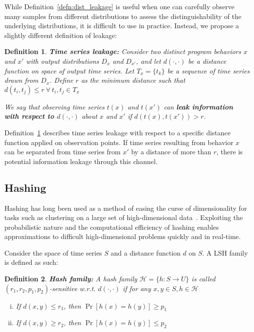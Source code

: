 \documentclass[a4paper]{article}
\newtheorem{definition}{Definition}
\begin{document}
While Definition~\ref{defn:dist_leakage} is useful when one can carefully observe many samples from different distributions to assess the distinguishability of the underlying distributions, it is difficult to use in practice.
Instead, we propose a slightly different definition of leakage:

\begin{definition}\label{defn:leakage}
	\textbf{Time series leakage:} Consider two distinct program behaviors $x$ and $x'$ with output distributions $D_x$ and $D_{x'}$, and let $d(\cdot,\cdot)$ be a distance function on space of output time series.
    Let $T_x = \{t_k\}$ be a sequence of time series drawn from $D_x$.
    Define $r$ as the minimum distance such that $d(t_i, t_j) \le r~\forall~t_i,t_j \in T_x$

    We say that observing time series $t(x)$ and $t(x')$ can \textbf{leak information with respect to $d(\cdot,\cdot)$} about $x$ and $x'$ if $d(t(x),t(x')) > r$.
\end{definition}

Definition~\ref{defn:leakage} describes time series leakage with respect to a specific distance function applied on observation points.
If time series resulting from behavior $x$ can be separated from time series from $x'$ by a distance of more than $r$, there is potential information leakage through this channel.

\subsection{Hashing}
\label{subsec:hashing}
Hashing has long been used as a method of easing the curse of dimensionality for tasks such as clustering on a large set of high-dimensional data~\cite{Indyk98-ANN,Gionis99-SSH,Datar04-LSH}.
Exploiting the probabilistic nature and the computational efficiency of hashing enables approximations to difficult high-dimensional problems quickly and in real-time.

Consider the space of time series $S$ and a distance function $d$ on $S$.
A LSH family is defined as such:

\begin{definition}\label{defn:hash_family}
    \textbf{Hash family:}
    A hash family $\mathcal{H} = \{ h : S \rightarrow U \}$ is called $(r_1, r_2, p_1, p_2)$-sensitive w.r.t. $d(\cdot,\cdot)$ if for any $x,y \in S, h \in \mathcal{H}$
    \begin{enumerate}[(i)]
        \item\label{itm:hash_def1} If $d(x,y) \le r_1$, then $\Pr[h(x) = h(y)] \ge p_1$
        \item\label{itm:hash_def2} If $d(x,y) \ge r_2$, then $\Pr[h(x) = h(y)] \le p_2$
    \end{enumerate}
\end{definition}
\end{document}
